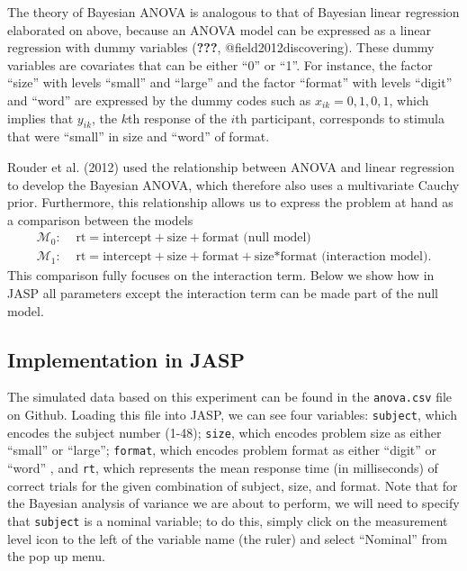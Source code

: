 \documentclass[english,,doc,floatsintext]{apa6}
\begin{document}
The theory of Bayesian ANOVA is analogous to that of Bayesian linear regression elaborated on above, because an ANOVA model can be expressed as a linear regression with dummy variables ({\textbf{???}}, @field2012discovering). These dummy variables are covariates that can be either \enquote{0} or \enquote{1}. For instance, the factor \enquote{size} with levels \enquote{small} and \enquote{large} and the factor \enquote{format} with levels \enquote{digit} and \enquote{word} are expressed by the dummy codes such as \(x_{ik} = 0, 1, 0, 1\), which implies that \(y_{ik}\), the \(k\)th response of the \(i\)th participant, corresponds to stimula that were \enquote{small} in size and \enquote{word} of format.

Rouder et al. (2012) used the relationship between ANOVA and linear regression to develop the Bayesian ANOVA, which therefore also uses a multivariate Cauchy prior. Furthermore, this relationship allows us to express the problem at hand as a comparison between the models
\begin{align*}
  \mathcal{M}_{0}: & \text{ rt} = \text{intercept} + \text{size}+\text{format} \text{ (null model)}\\
  \mathcal{M}_{1}: & \text{ rt} = \text{intercept} + \text{size}+\text{format}+\text{size*format} \text{ (interaction model)}. 
\end{align*}
This comparison fully focuses on the interaction term. Below we show how in JASP all parameters except the interaction term can be made part of the null model.

\hypertarget{implementation-in-jasp-2}{%
\subsection{Implementation in JASP}\label{implementation-in-jasp-2}}

The simulated data based on this experiment can be found in the \texttt{anova.csv} file on Github. Loading this file into JASP, we can see four variables: \texttt{subject}, which encodes the subject number (1-48); \texttt{size}, which encodes problem size as either \enquote{small} or \enquote{large}; \texttt{format}, which encodes problem format as either \enquote{digit} or \enquote{word} , and \texttt{rt}, which represents the mean response time (in milliseconds) of correct trials for the given combination of subject, size, and format. Note that for the Bayesian analysis of variance we are about to perform, we will need to specify that \texttt{subject} is a nominal variable; to do this, simply click on the measurement level icon to the left of the variable name (the ruler) and select \enquote{Nominal} from the pop up menu.
\end{document}
